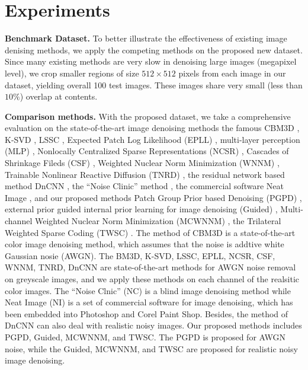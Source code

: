 


\section{Experiments}

\textbf{Benchmark Dataset.} To better illustrate the effectiveness of existing image denising methods, we apply the competing methods on the proposed new dataset. Since many existing methods are very slow in denoising large images (megapixel level), we crop smaller regions of size $512\times512$ pixels from each image in our dataset, yielding overall 100 test images. These images share very small (less than $10\%$) overlap at contents.

\textbf{Comparison methods.} With the proposed dataset, we take a comprehensive evaluation on the state-of-the-art image denoising methods the famous CBM3D \cite{cbm3d}, K-SVD \cite{ksvd}, LSSC \cite{lssc}, Expected Patch Log Likelihood (EPLL) \cite{epll}, multi-layer perception (MLP) \cite{mlp}, Nonlocally Centralized Sparse Representations (NCSR) \cite{ncsr}, Cascades of Shrinkage Fileds (CSF) \cite{csf}, Weighted Nuclear Norm Minimization (WNNM) \cite{wnnm}, Trainable Nonlinear Reactive Diffusion (TNRD) \cite{tnrd}, the residual network based method DnCNN \cite{dncnn}, the ``Noise Clinic'' method \cite{noiseclinic,ncwebsite}, the commercial software Neat Image \cite{neatimage}, and our proposed methods Patch Group Prior based Denoising (PGPD) \cite{pgpd}, external prior guided internal prior learning for image denoising (Guided) \cite{guided}, Multi-channel Weighted Nuclear Norm Minimization (MCWNNM) \cite{mcwnnm}, the Trilateral Weighted Sparse Coding (TWSC) \cite{twsc}. The method of CBM3D is a state-of-the-art color image denoising method, which assumes that the noise is addtive white Gaussian nosie (AWGN). The BM3D, K-SVD, LSSC, EPLL, NCSR, CSF, WNNM, TNRD, DnCNN are state-of-the-art methods for AWGN noise removal on greyscale images, and we apply these methods on each channel of the realsitic color images.  The ``Noise Clnic'' (NC) is a blind image denoising method while Neat Image (NI) is a set of commercial software for image denoising, which has been embedded into Photoshop and Corel Paint Shop. Besides, the method of DnCNN \cite{dncnn} can also deal with realistic noisy images. Our proposed methods includes PGPD, Guided, MCWNNM, and TWSC. The PGPD is proposed for AWGN noise, while the Guided, MCWNNM, and TWSC are proposed for realistic noisy image denoising.

